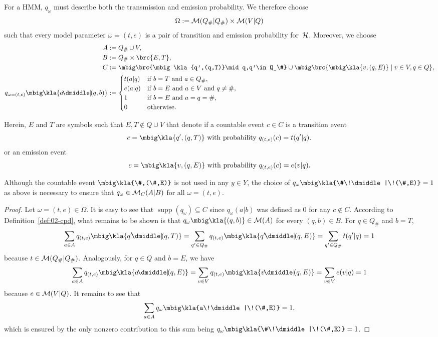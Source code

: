 For a HMM, $q_\omega$ must describe both the transmission and emission
probability. We therefore choose
\[
 \Omega := \mathcal M(Q_\#|Q_\#) \times\mathcal M(V|Q)
\]
such that every model parameter $\omega=(t,e)$ is a pair of transition and
emission probability for~$\mathcal H$. Moreover, we choose
\begin{align*}
 A &:= Q_\#\cup V, \\
 B &:= Q_\# \times \brc{E,T}, \\
 C &:= \mbig\brc{\mbig\kla{q',(q,T)}\mid q,q'\in Q_\#} \cup \mbig\brc{\mbig\kla{v,(q,E)}\mid v\in V, q\in Q}, \\
 q_{\omega=(t,e)}\mbig\kla{a\!\dmiddle|\!(q,b)} &:= \begin{cases}
  t(a|q) & \text{if } b = T \text{ and } a\in Q_\#, \\
  e(a|q) & \text{if } b = E \text{ and } a\in V \text{ and } q \neq\#, \\
  1 & \text{if } b = E \text{ and } a = q = \#, \\
  0 & \text{otherwise.}
 \end{cases}
\end{align*}

Herein, $E$ and $T$ are symbols such that $E,T\notin Q\cup V$ that denote if a
countable event $c\in C$ is a transition event
\[
 c = \mbig\kla{q',(q,T)} \text{ with probability } q_{(t,e)}(c) = t(q'|q).
\]
or an emission event
\[
 c = \mbig\kla{v,(q,E)} \text{ with probability } q_{(t,e)}(c) = e(v|q).
\]

Although the countable event $\mbig\kla{\#,(\#,E)}$ is not used in any $y\in
Y$, the choice of $q_\omega\mbig\kla{\#\!\dmiddle|\!(\#,E)}=1$ as above is
necessary to ensure that $q_\omega\in\mathcal M_C(A|B)$ for all $\omega=(t,e)$.

\begin{proof}
 Let $\omega=(t,e)\in\Omega$. It is easy to see that
 $\operatorname{supp}(q_\omega)\subseteq C$ since $q_\omega(a|b)$ was defined
 as 0 for any $c\notin C$. According to Definition~\ref{def:02-cpd}, what
 remains to be shown is that $q_\omega\mbig\kla{(q,b)}\in\um(A)$ for every
 $(q,b)\in B$. For $q\in Q_\#$ and $b = T$,
 \[
  \sum_{a\in A} q_{(t,e)}\mbig\kla{q'\!\dmiddle|\!(q,T)} = \sum_{q'\in Q_\#} q_{(t,e)}\mbig\kla{q'\!\dmiddle|\!(q,E)} = \sum_{q'\in Q_\#} t(q'|q) = 1
 \]
 because $t\in\mathcal M(Q_\#|Q_\#)$. Analogously, for $q\in Q$ and $b = E$, we have
 \[
  \sum_{a\in A} q_{(t,e)}\mbig\kla{a\!\dmiddle|\!(q,E)} = \sum_{v\in V} q_{(t,e)}\mbig\kla{v\!\dmiddle|\!(q,E)} = \sum_{v\in V} e(v|q) = 1
 \]
 because $e\in\mathcal M(V|Q)$. It remains to see that
 \[
  \sum_{a\in A} q_\omega\mbig\kla{a\!\dmiddle|\!(\#,E)} = 1,
 \]
 which is ensured by the only nonzero contribution to this sum being
 $q_\omega\mbig\kla{\#\!\dmiddle|\!(\#,E)} = 1$.
\end{proof}

